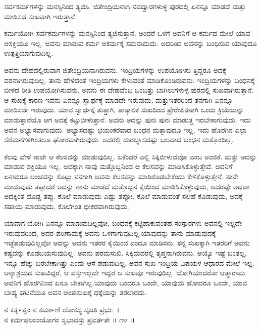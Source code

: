 \begin{artha}
ಸರ್ವಕರ್ಮಗಳನ್ನು ಮನಸ್ಸಿನಿಂದ ತ್ಯಜಿಸಿ, ಜಿತೇಂದ್ರಿಯನಾಗಿ ನವದ್ವಾರಗಳುಳ್ಳ ಪುರದಲ್ಲಿ ಏನನ್ನೂ ಮಾಡದೆ ಮತ್ತು ಮಾಡಿಸದೆ ಸುಖವಾಗಿ ಇರುತ್ತಾನೆ.
\end{artha}

ಕರ್ಮಯೋಗಿ ಸರ್ವಕರ್ಮಗಳನ್ನು ಮನಸ್ಸಿನಿಂದ ತ್ಯಜಿಸುತ್ತಾನೆ. ಅಂದರೆ ಒಳಗೆ ಅವನಿಗೆ \break ಆ ಕರ್ಮದ ಮೇಲೆ ಯಾವ ಆಸಕ್ತಿಯೂ ಇಲ್ಲ. ಅವನು ಮಾಡುವ ಕರ್ಮ ಅಕರ್ಮಕ್ಕೆ ಸಮನಾದುದು. ಅದರಿಂದ ಅವನನ್ನು ಬಂಧಿಸುವ ಯಾವುದೂ ಉತ್ಪತ್ತಿಯಾಗುವುದಿಲ್ಲ.

ಅವನು ದೇಹದಲ್ಲಿರುವಾಗ ಜಿತೇಂದ್ರಿಯನಾಗಿರುವನು. ಇಂದ್ರಿಯಗಳನ್ನು ಉಪಯೋಗಿಸು ತ್ತಿದ್ದರೂ ಅದಕ್ಕೆ ವಶನಾಗಿರುವುದಿಲ್ಲ. ತಾನು ಹೇಳಿದಂತೆ ಇಂದ್ರಿಯಗಳು ಕೇಳುವಂತೆ ಮಾಡಿ\-ಕೊಂಡಿರುವನು. ಇಂದ್ರಿಯಗಳನ್ನು ಬಂಧನಕ್ಕೆ ಬೀಳದ ರೀತಿ ಉಪಯೋಗಿಸುವನು. ಅವನು ಈ ದೇಹವೆಂಬ ಒಂಬತ್ತು ಬಾಗಿಲುಗಳುಳ್ಳ ಪುರದಲ್ಲಿ ಸುಖವಾಗಿರುತ್ತಾನೆ. ಆ ಸುಖಕ್ಕೆ ಕಾರಣ ಇವನು ಏನನ್ನೂ ಸ್ವಾರ್ಥಕ್ಕೆ ಮಾಡದೇ ಇರುವುದು, ಮತ್ತುಇತರರಿಂದ ತನಗಾಗಿ ಏನನ್ನೂ ಮಾಡಿಸದೇ ಇರುವುದು. ಯಾವ ಸ್ವಾರ್ಥಕ್ಕೆ ತುತ್ತಾಗಿ, ತಾತ್ಕಾಲಿಕ ಸುಖದಿಂದ ಪ್ರೇರೇಪಿತನಾಗಿ ಒಂದು ಕ್ರಿಯೆಯನ್ನು ಮಾಡುತ್ತಾನೆಯೊ ಆಗ ಅದಕ್ಕೆ ಕಟ್ಟುಬೀಳುತ್ತಾನೆ. ಅವನು ಅದನ್ನು ಪುನಃ ಪುನಃ ಮಾಡುತ್ತ ಇರಬೇಕಾಗುವುದು. ಇದು ಅವನ ಅಭ್ಯಾಸವಾಗುವುದು. ಅಭ್ಯಾಸದಷ್ಟು ಭಯಂಕರವಾದ ಬಂಧನ ಮತ್ತಾವುದೂ ಇಲ್ಲ. ಇದು ಹೊರಗಿನ ಎಲ್ಲಾ ಸೆರೆಮನೆಗಳಿಗಿಂತಲೂ ಘೋರವಾಗಿರುವುದು. ಅದರಲ್ಲಿ ದುರಭ್ಯಾಸದಷ್ಟು ಬಲವಾದ ಬಂಧನ ಮತ್ತೊಂದಿಲ್ಲ.

ಕೆಲವು ವೇಳೆ ನಾವೇ ಆ ಕೆಲಸವನ್ನು ಮಾಡುವುದಿಲ್ಲ. ಏಕೆಂದರೆ ಎಲ್ಲಿ ಸಿಕ್ಕಿಬೀಳುವೆವೋ ಎಂಬ ಅಂಜಿಕೆ. ಮತ್ತು ಅದನ್ನು ಮಾಡುವ ಶಕ್ತಿಯೂ ಇಲ್ಲ. ಅದಕ್ಕಾಗಿ ನಾವು ಮತ್ತೊಬ್ಬನಿಂದ ಆ ಕೆಲಸವನ್ನು ಮಾಡಿಸಿಕೊಳ್ಳುತ್ತೇವೆ. ಅವನಿಗೆ ಏನಾದರೂ ಲಂಚವನ್ನು ಕೊಟ್ಟು ನನಗಾಗಿ ಅವನು ಕೆಲಸವನ್ನು ಮಾಡಿಕೊಡಬೇಕೆಂದು ಕೇಳಿಕೊಳ್ಳುತ್ತೇನೆ. ನಾನೇ ಮಾಡುವುದು ತಪ್ಪಾದರೆ ಅದನ್ನು ನಾನು ಮಾಡದೆ ಮತ್ತೊಬ್ಬನ ಕೈಯಿಂದ ಮಾಡಿಸಿಕೊಳ್ಳುವುದು, ಅದರಷ್ಟೇ ಅಥವಾ ಅದಕ್ಕಿಂತ ದೊಡ್ಡ ತಪ್ಪು. ಕೊಲೆ ಮಾಡುವುದು ಎಷ್ಟು ತಪ್ಪೋ, ಕೊಲೆ ಮಾಡುವಂತೆ ಸಲಹೆ ಕೊಡುವುದು, ಅದಕ್ಕೆ ಸಹಾಯ ಮಾಡುವುದು, ಕೊಲೆಗಿಂತ ಭೀಕರವಾಗಿರುವುದು.

ಯಾವಾಗ ಯೋಗಿ ಏನನ್ನೂ ಮಾಡುವುದಿಲ್ಲವೋ, ಬಂಧನಕ್ಕೆ ಕಟ್ಟಿಹಾಕುವಂತಹ ಸಂಸ್ಕಾರಗಳು ಅವನಲ್ಲಿ ಇಲ್ಲದೇ ಇರುವುದರಿಂದ, ಅದರ ಪರಿಣಾಮಕ್ಕೆ ಅವನು ಒಳಗಾಗುವುದಿಲ್ಲ.\break ಯಾವುದನ್ನು ತಾನು ಮಾಡುವುದಕ್ಕೆ ಇಚ್ಛೆಪಡುವುದಿಲ್ಲವೋ ಅದನ್ನು ಅವನು ಇತರರ ಕೈಯಿಂದ ಎಂದೂ ಮಾಡಿಸನು. ತನ್ನ ಸುಖಕ್ಕಾಗಿ ಇತರರಿಗೆ ಅವನು ಕಷ್ಟವನ್ನು ಕೊಡಬಯಸುವುದಿಲ್ಲ. ಅವನು ಪರಮಸುಖಿ. ಸಿಕ್ಕಿದುದರಲ್ಲಿ ತೃಪ್ತನಾಗಿರುವನು. ಅಯ್ಯೊ ಇಷ್ಟೆ ಬಂತಲ್ಲ, ಇನ್ನೂ ಹೆಚ್ಚು ಬರಬೇಕಾಗಿತ್ತು ಎಂದು ಆಸೆ ಪಡುವುದಿಲ್ಲ. ಅವನ ಸುಖ ಇಂದ್ರಿಯ ವಿಷಯಳ ಆಧಾರದ ಮೇಲೆ ಇಲ್ಲ. ಅನ್ಯಾಶ್ರಯದ ಸುಖವಿದ್ದರೆ, ಆ ವಸ್ತುಇಲ್ಲದೇ ಇದ್ದರೆ ಆ ಸುಖವೂ ಇರುವುದಿಲ್ಲ. ಯೋಗಿಯಾದರೋ ಆತ್ಮಾರಾಮ. ಅವನಿಗೆ ಹೊರಗಿನಿಂದ ಏನೂ ಬೇಕಾಗಿಲ್ಲ.\break ಯಾವುದು ಬಂದರೂ ಒಂದೇ, ಯಾವುದು ಹೋದರೂ ಒಂದೇ, ಯಾವ ಬಾಹ್ಯ ಘಟನೆಯೂ ಅವನ ಅಂತಃಸುಖಕ್ಕೆ ಧಕ್ಕೆಯನ್ನು ತರಲಾರದು.

\begin{shloka}
ನ ಕರ್ತೃತ್ವಂ ನ ಕರ್ಮಾಣಿ ಲೋಕಸ್ಯ ಸೃಜತಿ ಪ್ರಭುಃ~।\\ನ ಕರ್ಮಫಲಸಂಯೋಗಂ ಸ್ವಭಾವಸ್ತು ಪ್ರವರ್ತತೇ \hfill॥ ೧೪~॥
\end{shloka}

